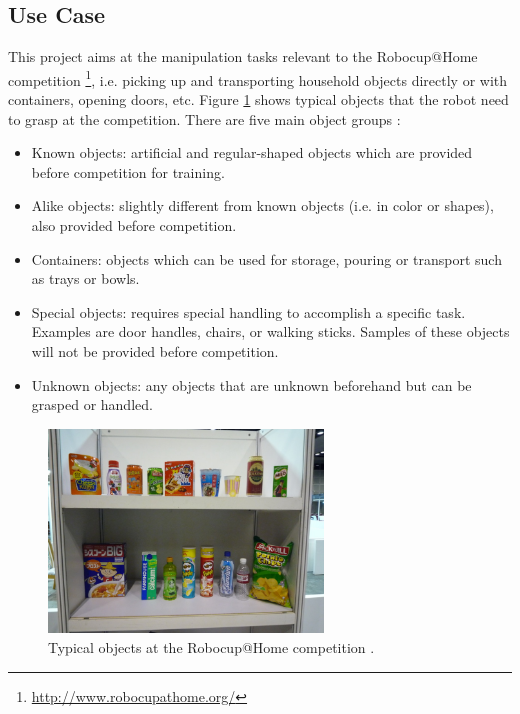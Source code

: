 \documentclass[12pt]{article}
\begin{document}
    \subsection{Use Case} \label{use-case}
    This project aims at the manipulation tasks relevant to the Robocup@Home competition \footnote{\url{http://www.robocupathome.org/}}, i.e. picking up and transporting household objects directly or with containers, opening doors, etc. Figure \ref{fig:robocup_objects} shows typical objects that the robot need to grasp at the competition. There are five main object groups \cite{vanBeek17}:
    \begin{itemize}
    	\item Known objects: artificial and regular-shaped objects which are provided before competition for training.
    	\item Alike objects: slightly different from known objects (i.e. in color or shapes), also provided before competition.
    	\item Containers: objects which can be used for storage, pouring or transport such as trays or bowls.
    	\item Special objects: requires special handling to accomplish a specific task. Examples are door handles, chairs, or walking sticks. Samples of these objects will not be provided before competition.
    	\item Unknown objects: any objects that are unknown beforehand but can be grasped or handled.
    \end{itemize}
    \begin{figure}[H]
    	\centering
    	\includegraphics[width=0.65\textwidth]{vanBeek17-robocup_objects}
    	\caption{Typical objects at the Robocup@Home competition \cite{vanBeek17}.}
    	\label{fig:robocup_objects}
    \end{figure}
\end{document}
